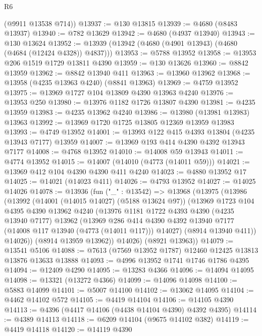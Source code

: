 \begin{lexlean}{R6}
\begin{coremodule}
      (@9911 @13538 @714))
@13937 := @130 @13815
@13939 := @4680 (@8483 @13937)
@13940 := @782 @13629
@13942 := @4680 (@4937 @13940)
@13943 := @130 @13624
@13952 := @13939 (@13942 (@4680 (@4901 @13943) (@4680 (@4684 (@12424 @4328)) @4837)))
@13953 := @5788 @13952
@13958 := @13953 @206 @1519 @1729 @13811 @4390
@13959 := @130 @13626
@13960 := @8842 @13959
@13962 := @8842 @13940 @411
@13963 := @13960 @13962
@13968 := @13958 (@4235 @13963 @4240) (@8841 @13963)
@13969 := @4759 @13952
@13975 := @13969 @1727 @104 @13809 @4390 @13963 @4240
@13976 := @13953 @250
@13980 := @13976 @1182 @1726 @13807 @4390
@13981 := @4235 @13959
@13983 := @4235 @13962 @4240
@13986 := @13980 (@13981 @13983) @13963
@13992 := @13969 @1720 @1725 @13805 @12369 @13959 @13983
@13993 := @4749 @13952
@14001 := @13993 @122 @415 @4393 @13804 (@4235 @13943 @7177) @13959
@14007 := @13969 @193 @414 @4390 @4392 @13943 @7177
@14008 := @4768 @13952
@14010 := @14008 @59 @13943
@14011 := @4774 @13952
@14015 := @14007 (@14010 (@4773 (@14011 @59)))
@14021 := @13969 @412 @104 @4390 @4390 @411 @4240
@14023 := @4880 @13952 @17
@14025 := @14021 (@14023 @411)
@14026 := @4793 @13952
@14027 := @14025 @14026
@14078 := @13936
    (fun ("_" : @13542) =>
    @13968
      (@13975
        (@13986
          (@13992
            (@14001 (@14015 @14027) (@5188 @13624 @97))
            (@13969
              @1723
              @104
              @4395
              @4390
              @13962
              @4240
              (@13976
                @1181
                @1722
                @4393
                @4390
                (@4235 @13940 @7177)
                @13962
                (@13969
                  @286
                  @414
                  @4390
                  @4392
                  @13940
                  @7177
                  (@14008 @117 @13940 (@4773 (@14011 @117)))
                  @14027)
                (@8914 @13940 @411))
              @14026))
          (@8914 @13959 @13962))
        @14026)
      (@8921 @13963))
@14079 := @13541 @5106
@14088 := @7613 (@7569 @13952 @1787) @12460 @12425 @13813 @13876 @13633 @13888
@14093 := @4996 @13952 @1741 @1746 @1786 @4395
@14094 := @12409 @4290
@14095 := @13283 @4366
@14096 := @14094 @14095
@14098 := @13321 (@13272 @4366)
@14099 := @14096 @14098
@14100 := @5883 @14099
@14101 := @5007 @14100
@14102 := @13062 @14095
@14104 := @4462 @14102 @572
@14105 := @4419 @14104
@14106 := @14105 @4390
@14113 := @4396 (@4417 @14106 (@4438 @14104 @4390) @4392 @4395)
@14114 := @4389 @14113
@14118 := @6209 @14104 (@9675 @14102 @382)
@14119 := @4419 @14118
@14120 := @14119 @4390

\end{coremodule}
\end{lexlean}
